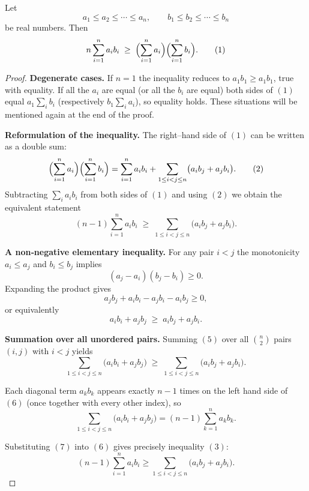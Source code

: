 \begin{theorem}
Let  
\[
a_{1}\le a_{2}\le\cdots\le a_{n},\qquad
b_{1}\le b_{2}\le\cdots\le b_{n}
\]
be real numbers.  Then  
\[
n\sum_{i=1}^{n}a_{i}b_{i}\;\ge\;
\Bigl(\sum_{i=1}^{n}a_{i}\Bigr)\Bigl(\sum_{i=1}^{n}b_{i}\Bigr). \tag{1}
\]
\end{theorem}

\begin{proof}
\textbf{Degenerate cases.}  
If \(n=1\) the inequality reduces to \(a_{1}b_{1}\ge a_{1}b_{1}\), true with
equality.  If all the \(a_{i}\) are equal (or all the \(b_{i}\) are equal)
both sides of \((1)\) equal \(a_{1}\sum_{i}b_{i}\) (respectively
\(b_{1}\sum_{i}a_{i}\)), so equality holds.  These situations will be
mentioned again at the end of the proof.

\medskip\noindent\textbf{Reformulation of the inequality.}  
The right–hand side of \((1)\) can be written as a double sum:
\[
\Bigl(\sum_{i=1}^{n}a_{i}\Bigr)\Bigl(\sum_{i=1}^{n}b_{i}\Bigr)
   =\sum_{i=1}^{n}a_{i}b_{i}
    +\sum_{1\le i<j\le n}\bigl(a_{i}b_{j}+a_{j}b_{i}\bigr). \tag{2}
\]
Subtracting \(\sum_{i}a_{i}b_{i}\) from both sides of \((1)\) and using
\((2)\) we obtain the equivalent statement
\[
(n-1)\sum_{i=1}^{n}a_{i}b_{i}
   \;\ge\;
\sum_{1\le i<j\le n}\bigl(a_{i}b_{j}+a_{j}b_{i}\bigr). \tag{3}
\]

\medskip\noindent\textbf{A non‑negative elementary inequality.}  
For any pair \(i<j\) the monotonicity \(a_{i}\le a_{j}\) and \(b_{i}\le b_{j}\)
implies
\[
(a_{j}-a_{i})(b_{j}-b_{i})\ge 0. \tag{4}
\]
Expanding the product gives
\[
a_{j}b_{j}+a_{i}b_{i}-a_{j}b_{i}-a_{i}b_{j}\ge 0,
\]
or equivalently
\[
a_{i}b_{i}+a_{j}b_{j}\;\ge\;a_{i}b_{j}+a_{j}b_{i}. \tag{5}
\]

\medskip\noindent\textbf{Summation over all unordered pairs.}  
Summing \((5)\) over all \(\binom{n}{2}\) pairs \((i,j)\) with \(i<j\) yields
\[
\sum_{1\le i<j\le n}\bigl(a_{i}b_{i}+a_{j}b_{j}\bigr)
   \;\ge\;
\sum_{1\le i<j\le n}\bigl(a_{i}b_{j}+a_{j}b_{i}\bigr). \tag{6}
\]

Each diagonal term \(a_{k}b_{k}\) appears exactly \(n-1\) times on the left
hand side of \((6)\) (once together with every other index), so
\[
\sum_{1\le i<j\le n}\bigl(a_{i}b_{i}+a_{j}b_{j}\bigr)
   =(n-1)\sum_{k=1}^{n}a_{k}b_{k}. \tag{7}
\]

Substituting \((7)\) into \((6)\) gives precisely inequality \((3)\):
\[
(n-1)\sum_{i=1}^{n}a_{i}b_{i}
   \ge
\sum_{1\le i<j\le n}\bigl(a_{i}b_{j}+a_{j}b_{i}\bigr).
\]


\end{proof}
